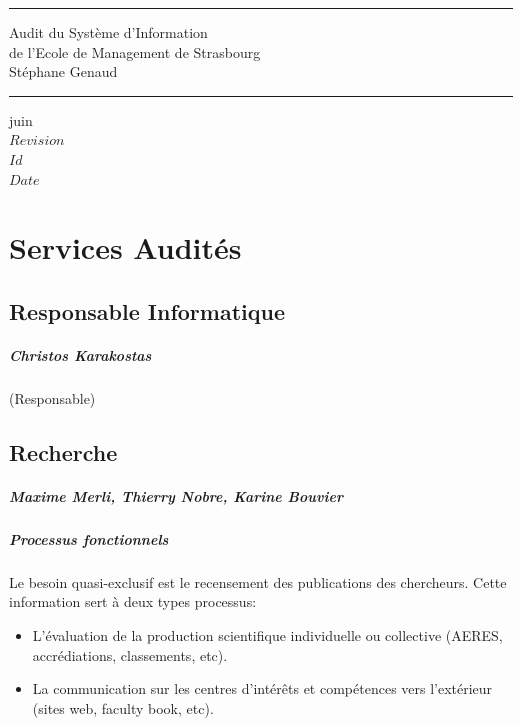 \documentclass{book}
\begin{document}
\newcommand{\motcle}[1]{\index{#1}\emph{#1}}
\newcommand{\instrcle}[1]{\index{\texttt{#1}}\texttt{#1}}

\thispagestyle{empty}
\rhead[]{}
\pagestyle{fancy}
\setlength{\parindent}{0mm}
\setlength{\parskip}{0mm}
\rule{\linewidth}{1mm}
\begin{center}
\Large{Audit du Système d'Information}\\[5mm]
\Large{de l'Ecole de Management de Strasbourg}\\[5mm]
\large{Stéphane Genaud}
\rule{\linewidth}{1mm}
\end{center}
\begin{center}
juin  \\
\textrm{
$Revision$\\
$Id$\\
$Date$\\
}
\end{center}

\tableofcontents
\newpage

 
 

\chapter{Services Audités}
 

\section{Responsable Informatique}

\paragraph{Christos Karakostas} (Responsable)


\section{Recherche}
\paragraph{Maxime Merli, Thierry Nobre, Karine Bouvier}

\paragraph{Processus fonctionnels}
Le besoin quasi-exclusif est le recensement des publications des chercheurs.
Cette information sert à deux types processus:
\begin{itemize}
\item L'évaluation de la production scientifique individuelle ou 
collective (AERES, accrédiations, classements, etc).
\item La communication sur les centres d'intérêts et compétences 
vers l'extérieur (sites web, faculty book, etc).
\end{itemize}
\end{document}
